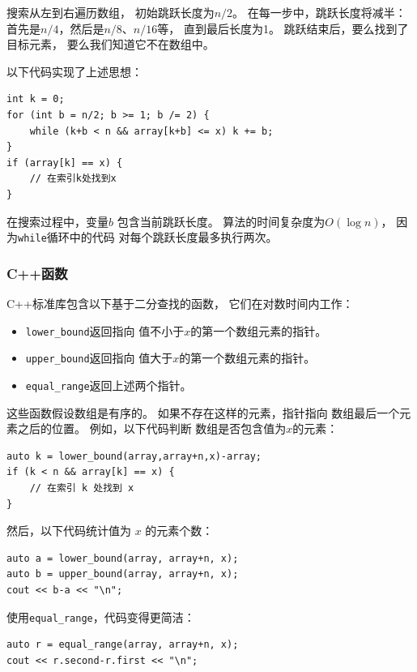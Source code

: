 搜索从左到右遍历数组，
初始跳跃长度为$n/2$。
在每一步中，跳跃长度将减半：
首先是$n/4$，然后是$n/8$、$n/16$等，
直到最后长度为1。
跳跃结束后，要么找到了目标元素，
要么我们知道它不在数组中。

以下代码实现了上述思想：
\begin{lstlisting}
int k = 0;
for (int b = n/2; b >= 1; b /= 2) {
    while (k+b < n && array[k+b] <= x) k += b;
}
if (array[k] == x) {
    // 在索引k处找到x
}
\end{lstlisting}

在搜索过程中，变量$b$
包含当前跳跃长度。
算法的时间复杂度为$O(\log n)$，
因为\texttt{while}循环中的代码
对每个跳跃长度最多执行两次。

\subsubsection{C++函数}

C++标准库包含以下基于二分查找的函数，
它们在对数时间内工作：

\begin{itemize}
\item \texttt{lower\_bound}返回指向
值不小于$x$的第一个数组元素的指针。
\item \texttt{upper\_bound}返回指向
值大于$x$的第一个数组元素的指针。
\item \texttt{equal\_range}返回上述两个指针。
\end{itemize}

这些函数假设数组是有序的。
如果不存在这样的元素，指针指向
数组最后一个元素之后的位置。
例如，以下代码判断
数组是否包含值为$x$的元素：

\begin{lstlisting}
auto k = lower_bound(array,array+n,x)-array;
if (k < n && array[k] == x) {
    // 在索引 k 处找到 x
}
\end{lstlisting}

然后，以下代码统计值为 $x$ 的元素个数：

\begin{lstlisting}
auto a = lower_bound(array, array+n, x);
auto b = upper_bound(array, array+n, x);
cout << b-a << "\n";
\end{lstlisting}

使用\texttt{equal\_range}，代码变得更简洁：

\begin{lstlisting}
auto r = equal_range(array, array+n, x);
cout << r.second-r.first << "\n";
\end{lstlisting}

